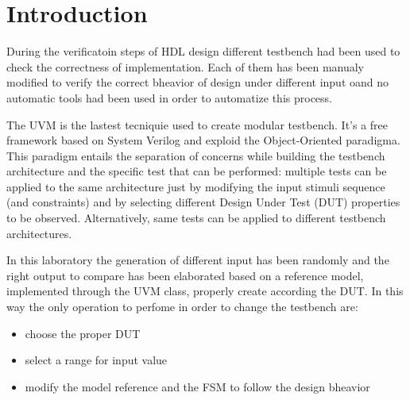 %
\chapter{Introduction}
\label{chap1}

During the verificatoin steps of HDL design different testbench had been used to 
check the correctness of implementation. Each of them has been manualy modified to 
verify the correct bheavior of design under different input oand no automatic tools 
had been used in order to automatize this process.

The UVM is the lastest tecniquie used to create modular testbench. It's a free framework 
based on System Verilog and exploid the Object-Oriented paradigma. This paradigm entails
the separation of concerns while building the testbench architecture and the specific test that
can be performed: multiple tests can be applied to the same architecture just by modifying the
input stimuli sequence (and constraints) and by selecting different Design Under Test (DUT)
properties to be observed. Alternatively, same tests can be applied to different testbench architectures.

In this laboratory the generation of different input has been randomly and the right output to compare has 
been elaborated based on a reference model, implemented through the UVM class, properly create according 
the DUT. In this way the only operation to perfome in order to change the testbench are:
\begin{itemize}
    \item choose the proper DUT
    \item select a range for input value
    \item modify the model reference and the FSM to follow the design bheavior
\end{itemize}


            